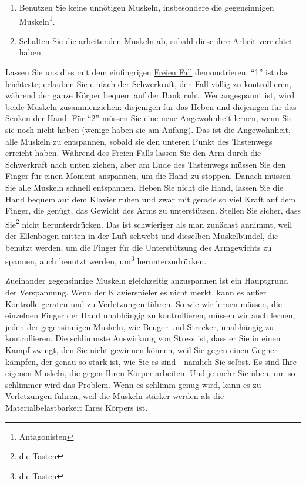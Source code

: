 \begin{enumerate}[label={\arabic*.}] 
\item Benutzen Sie keine unnötigen Muskeln, insbesondere die gegensinnigen Muskeln\footnote{Antagonisten}.
\item Schalten Sie die arbeitenden Muskeln ab, sobald diese ihre Arbeit verrichtet haben.
 \end{enumerate}
Lassen Sie uns dies mit dem einfingrigen \hyperlink{c1ii10}{Freien Fall} demonstrieren.
\enquote{1} ist das leichteste; erlauben Sie einfach der Schwerkraft, den Fall völlig zu kontrollieren, während der ganze Körper bequem auf der Bank ruht.
Wer angespannt ist, wird beide Muskeln zusammenziehen: diejenigen für das Heben und diejenigen für das Senken der Hand.
Für \enquote{2} müssen Sie eine neue Angewohnheit lernen, wenn Sie sie noch nicht haben (wenige haben sie am Anfang).
Das ist die Angewohnheit, alle Muskeln zu entspannen, sobald sie den unteren Punkt des Tastenwegs erreicht haben.
Während des Freien Falls lassen Sie den Arm durch die Schwerkraft nach unten ziehen, aber am Ende des Tastenwegs müssen Sie den Finger für einen Moment anspannen, um die Hand zu stoppen.
Danach müssen Sie alle Muskeln schnell entspannen.
Heben Sie nicht die Hand, lassen Sie die Hand bequem auf dem Klavier ruhen und zwar mit gerade so viel Kraft auf dem Finger, die genügt, das Gewicht des Arms zu unterstützen.
Stellen Sie sicher, dass Sie\footnote{die Tasten} nicht herunterdrücken.
Das ist schwieriger als man zunächst annimmt, weil der Ellenbogen mitten in der Luft schwebt und dieselben Muskelbündel, die benutzt werden, um die Finger für die Unterstützung des Armgewichts zu spannen, auch benutzt werden, um\footnote{die Tasten} herunterzudrücken.

Zueinander gegensinnige Muskeln gleichzeitig anzuspannen ist ein Hauptgrund der Verspannung.
Wenn der Klavierspieler es nicht merkt, kann es außer Kontrolle geraten und zu Verletzungen führen.
So wie wir lernen müssen, die einzelnen Finger der Hand unabhängig zu kontrollieren, müssen wir auch lernen, jeden der gegensinnigen Muskeln, wie Beuger und Strecker, unabhängig zu kontrollieren.
Die schlimmste Auswirkung von Stress ist, dass er Sie in einen Kampf zwingt, den Sie nicht gewinnen können, weil Sie gegen einen Gegner kämpfen, der genau so stark ist, wie Sie es sind - nämlich Sie selbst.
Es sind Ihre eigenen Muskeln, die gegen Ihren Körper arbeiten. 
Und je mehr Sie üben, um so schlimmer wird das Problem.
Wenn es schlimm genug wird, kann es zu Verletzungen führen, weil die Muskeln stärker werden als die Materialbelastbarkeit Ihres Körpers ist.

